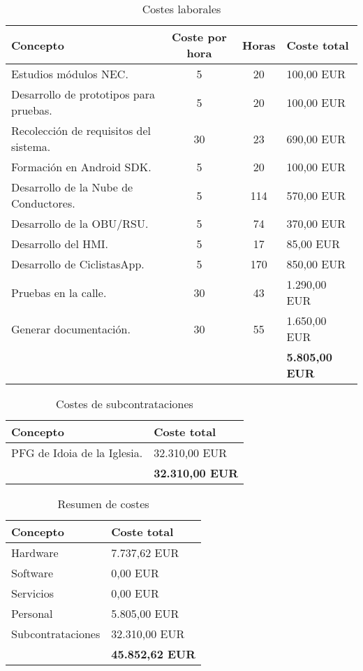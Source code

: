 \begin{table}
	\centering
	\caption{Costes laborales}\label{tab:presupuestoLaboral}
	\begin{tabular}{lccl}
		\toprule
		\textbf{Concepto} & \textbf{Coste por hora} & \textbf{Horas} & \textbf{Coste total} \\
		\midrule
		Estudios módulos NEC. & 5 & 20 & 100,00 EUR \\
		Desarrollo de prototipos para pruebas. & 5 & 20 & 100,00 EUR \\
		Recolección de requisitos del sistema. & 30 & 23 & 690,00 EUR \\
		Formación en Android SDK. & 5 & 20 & 100,00 EUR \\
		Desarrollo de la Nube de Conductores. & 5 & 114 & 570,00 EUR \\
		Desarrollo de la OBU/RSU. & 5 & 74 & 370,00 EUR \\
		Desarrollo del HMI. & 5 & 17 & 85,00 EUR \\
		Desarrollo de CiclistasApp. & 5 & 170 & 850,00 EUR \\
		Pruebas en la calle. & 30 & 43 & 1.290,00 EUR \\
		Generar documentación. & 30 & 55 & 1.650,00 EUR \\
		& & & \textbf{5.805,00 EUR} \\		
		\bottomrule
	\end{tabular}
\end{table}
\begin{table}
	\centering
	\caption{Costes de subcontrataciones}\label{tab:presupuestoSubcontrataciones}
	\begin{tabular}{ll}
		\toprule
		\textbf{Concepto} & \textbf{Coste total} \\
		\midrule
		PFG de Idoia de la Iglesia. & 32.310,00 EUR \\
		& \textbf{32.310,00 EUR} \\		
		\bottomrule
	\end{tabular}
\end{table}
\begin{table}[tp]
	\centering
	\caption{Resumen de costes}\label{tab:presupuestoResumen}
	\begin{tabular}{ll}
		\toprule
		\textbf{Concepto} & \textbf{Coste total} \\
		\midrule
		Hardware & 7.737,62 EUR \\
		Software & 0,00 EUR \\
		Servicios & 0,00 EUR \\
		Personal & 5.805,00 EUR \\
		Subcontrataciones & 32.310,00 EUR \\
		& \textbf{45.852,62 EUR} \\		
		\bottomrule
	\end{tabular}
\end{table}